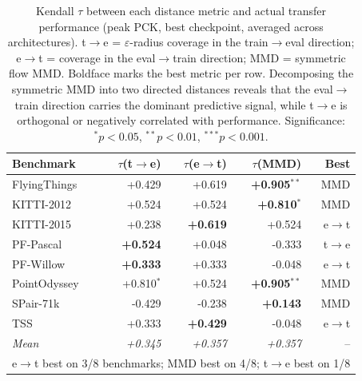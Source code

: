 \begin{table}[t]
\centering
\small
\caption{Kendall $\tau$ between each distance metric and actual transfer performance (peak PCK, best checkpoint, averaged across architectures). t$\to$e = $\varepsilon$-radius coverage in the train$\to$eval direction; e$\to$t = coverage in the eval$\to$train direction; MMD = symmetric flow MMD. Boldface marks the best metric per row. Decomposing the symmetric MMD into two directed distances reveals that the eval$\to$train direction carries the dominant predictive signal, while t$\to$e is orthogonal or negatively correlated with performance. Significance: $^*p{<}0.05$, $^{**}p{<}0.01$, $^{***}p{<}0.001$.}
\label{tab:directional_tau}
\setlength{\tabcolsep}{4pt}
\begin{tabular}{lrrrr}
\toprule
\textbf{Benchmark} & $\tau$(t$\to$e) & $\tau$(e$\to$t) & $\tau$(MMD) & Best \\
\midrule
FlyingThings & +0.429 & +0.619 & \textbf{+0.905$^{**}$} & MMD \\
KITTI-2012 & +0.524 & +0.524 & \textbf{+0.810$^{*}$} & MMD \\
KITTI-2015 & +0.238 & \textbf{+0.619} & +0.524 & e$\to$t \\
PF-Pascal & \textbf{+0.524} & +0.048 & -0.333 & t$\to$e \\
PF-Willow & \textbf{+0.333} & +0.333 & -0.048 & e$\to$t \\
PointOdyssey & +0.810$^{*}$ & +0.524 & \textbf{+0.905$^{**}$} & MMD \\
SPair-71k & -0.429 & -0.238 & \textbf{+0.143} & MMD \\
TSS & +0.333 & \textbf{+0.429} & -0.048 & e$\to$t \\
\midrule
\textit{Mean} & \textit{+0.345} & \textit{+0.357} & \textit{+0.357} & -- \\
\midrule
\multicolumn{5}{l}{\small e$\to$t best on 3/8 benchmarks; MMD best on 4/8; t$\to$e best on 1/8} \\
\bottomrule
\end{tabular}
\end{table}
